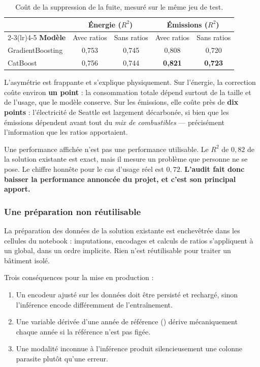 \begin{table}[H]
\centering
\small
\begin{tabular}{@{}lcccc@{}}
\toprule
& \multicolumn{2}{c}{\textbf{Énergie} ($R^2$)} & \multicolumn{2}{c}{\textbf{Émissions} ($R^2$)} \\
\cmidrule(lr){2-3}\cmidrule(lr){4-5}
\textbf{Modèle} & Avec ratios & Sans ratios & Avec ratios & Sans ratios \\
\midrule
GradientBoosting & 0,753 & 0,745 & 0,808 & 0,720 \\
CatBoost         & 0,756 & 0,744 & \textbf{0,821} & \textbf{0,723} \\
\bottomrule
\end{tabular}
\caption{Coût de la suppression de la fuite, mesuré sur le même jeu de test.}
\end{table}

L'asymétrie est frappante et s'explique physiquement. Sur l'énergie, la
correction coûte environ \textbf{un point} : la consommation totale dépend
surtout de la taille et de l'usage, que le modèle conserve. Sur les émissions,
elle coûte près de \textbf{dix points} : l'électricité de Seattle est largement
décarbonée, si bien que les émissions dépendent avant tout du \emph{mix de
combustibles} — précisément l'information que les ratios apportaient.

\begin{constat}{Une performance affichée n'est pas une performance utilisable.}
Le $R^2$ de $0{,}82$ de la solution existante est exact, mais il mesure un
problème que personne ne se pose. Le chiffre honnête pour le cas d'usage réel est
$0{,}72$. \textbf{L'audit fait donc baisser la performance annoncée du projet, et
c'est son principal apport.}
\end{constat}

\subsubsection{Une préparation non réutilisable}

La préparation des données de la solution existante est enchevêtrée dans les
cellules du notebook : imputations, encodages et calculs de ratios s'appliquent à
un  global, dans un ordre implicite. Rien n'est réutilisable pour
traiter un bâtiment isolé.

Trois conséquences pour la mise en production :

\begin{enumerate}[leftmargin=1.6em,itemsep=0.25em]
  \item Un encodeur ajusté sur les données doit être persisté et rechargé, sinon
        l'inférence encode différemment de l'entraînement.
  \item Une variable dérivée d'une année de référence ()
        dérive mécaniquement chaque année si la référence n'est pas figée.
  \item Une modalité inconnue à l'inférence produit silencieusement une colonne
        parasite plutôt qu'une erreur.
\end{enumerate}

